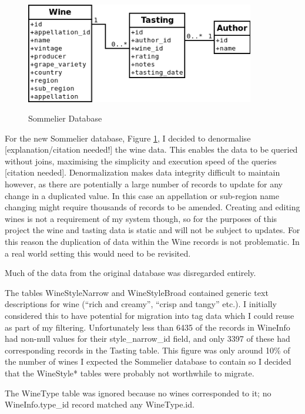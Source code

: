 
\begin{figure}[h!]
    \caption{Sommelier Database}
    \centering
        \includegraphics[width=10cm]{SommelierDBSimple}
    \label{fig:sommelierdb}
\end{figure}

For the new Sommelier database, Figure \ref{fig:sommelierdb}, I decided to denormalise [explanation/citation needed!] the wine data. This enables the data to be queried without joins, maximising the simplicity and execution speed of the queries [citation needed]. Denormalization makes data integrity difficult to maintain however, as there are potentially a large number of records to update for any change in a duplicated value. In this case an appellation or sub-region name changing might require thousands of records to be amended. Creating and editing wines is not a requirement of my system though, so for the purposes of this project the wine and tasting data is static and will not be subject to updates. For this reason the duplication of data within the Wine records is not problematic. In a real world setting this would need to be revisited.

Much of the data from the original database was disregarded entirely.

The tables WineStyleNarrow and WineStyleBroad contained generic text descriptions for wine (``rich and creamy'', ``crisp and tangy'' etc.). I initially considered this to have potential for migration into tag data which I could reuse as part of my filtering. Unfortunately less than 6435 of the records in WineInfo had non-null values for their style\_narrow\_id field, and only 3397 of these had corresponding records in the Tasting table. This figure was only around 10\% of the number of wines I expected the Sommelier database to contain so I decided that the WineStyle* tables were probably not worthwhile to migrate.

The WineType table was ignored because no wines corresponded to it; no WineInfo.type\_id record matched any WineType.id.

